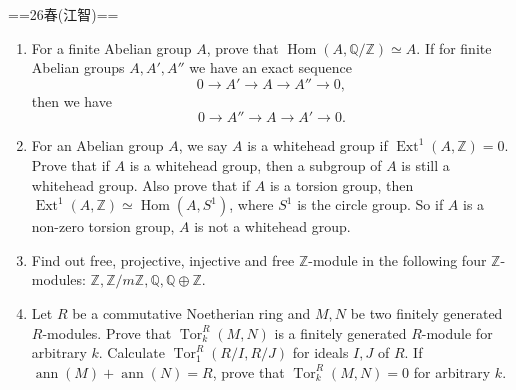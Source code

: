 
==26春(江智)==
\begin{enumerate}
    \item For a finite Abelian group \(A\), prove that \(\operatorname{Hom}(A,\mathbb{Q}/\mathbb{Z}) \simeq A\). 
    If for finite Abelian groups \(A,A',A''\) we have an exact sequence
    \[
        0  \longrightarrow A'  \longrightarrow A  \longrightarrow A''  \longrightarrow 0,
    \]
    then we have
    \[
        0  \longrightarrow A''  \longrightarrow A  \longrightarrow A'  \longrightarrow 0.
    \]


    \item For an Abelian group \(A\), we say \(A\) is a whitehead group if \(\operatorname{Ext}^1(A,\mathbb{Z})=0\).
    Prove that if \(A\) is a whitehead group, then a subgroup of \(A\) is still a whitehead group.
    Also prove that if \(A\) is a torsion group, then \(\operatorname{Ext}^1(A,\mathbb{Z}) \simeq \operatorname{Hom}(A,S^1)\), 
    where \(S^1\) is the circle group. So if \(A\) is a non-zero torsion group, \(A\) is not a whitehead group.


    \item Find out free, projective, injective and free \(\mathbb{Z}\)-module in the following four \(\mathbb{Z}\)-modules:
    \(\mathbb{Z}, \mathbb{Z}/m\mathbb{Z}, \mathbb{Q},\mathbb{Q} \oplus \mathbb{Z}\).

    \item Let \(R\) be a commutative Noetherian ring and \(M,N\) be two finitely generated \(R\)-modules. 
    Prove that \(\operatorname{Tor}^R_k(M,N)\) is a finitely generated \(R\)-module for arbitrary \(k\). 
    Calculate \(\operatorname{Tor}^R_1(R/I,R/J)\) for ideals \(I,J\) of \(R\). 
    If \(\operatorname{ann}(M)+\operatorname{ann}(N)=R\), prove that \(\operatorname{Tor}^R_k(M,N)=0\) for arbitrary \(k\). 



\end{enumerate}

